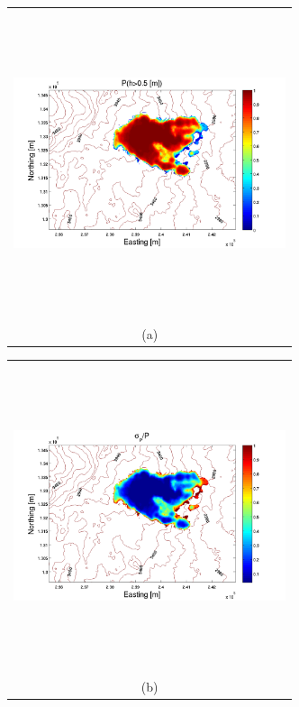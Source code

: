 \documentclass[12pt]{article}
\newcommand{\Pic}[2][0.85]{\begin{center}\texttt{[image: \#2]}
 \end{center} }
\begin{document}
\begin{figure}[H]
    \begin{minipage}[b]{0.6\textwidth}
        \begin{tabular}{c}
       \includegraphics[width=8cm,height=9cm,keepaspectratio]{Galeras_0_P.pdf}\\
        (a)
        \end{tabular}
    \end{minipage}
    \begin{minipage}{0.6\textwidth}
        \begin{tabular}{c}
	\includegraphics[width=8cm,height=9cm,keepaspectratio]{Galeras_0_sigma.pdf}\\
        (b)
        \end{tabular}

\end{minipage}
\end{figure}
\end{document}
